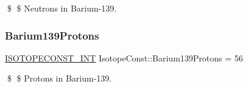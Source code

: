 \$ \$ Neutrons in Barium-\/139. \mbox{\label{group___isotope_const-_barium-_ba139_ga76fcf205d6ff2044f3245eccb87a92db}} 
\subsubsection{\texorpdfstring{Barium139\+Protons}{Barium139Protons}}
{\footnotesize\ttfamily \mbox{\hyperlink{group___isotope_const-_macros_ga5f18360b3e99483a35c32d789e62621c}{I\+S\+O\+T\+O\+P\+E\+C\+O\+N\+S\+T\+\_\+\+I\+NT}} Isotope\+Const\+::\+Barium139\+Protons = 56}

\$ \$ Protons in Barium-\/139. 